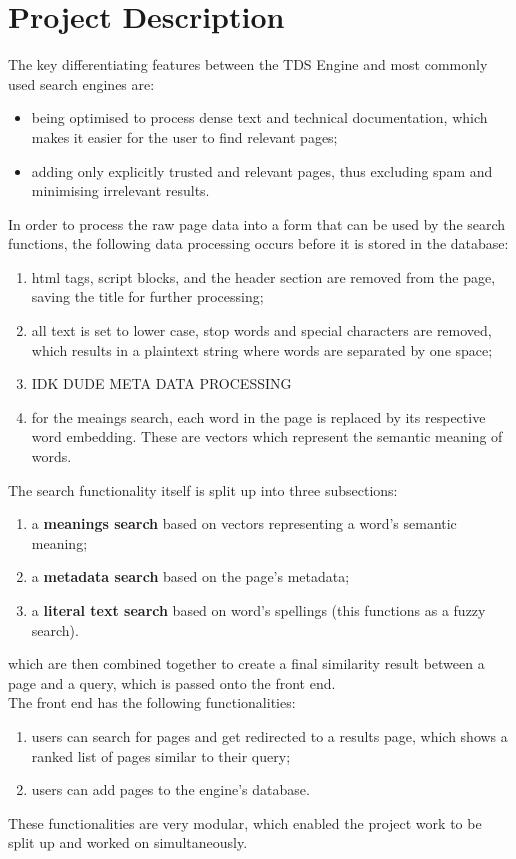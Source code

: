 \section{Project Description}

The key differentiating features between the TDS Engine and most commonly used search engines are:

\begin{itemize}
  \item being optimised to process dense text and technical documentation, which makes it easier for the user to find relevant pages;
  \item adding only explicitly trusted and relevant pages, thus excluding spam and minimising irrelevant results.
\end{itemize}

In order to process the raw page data into a form that can be used by the search functions, the following data processing occurs before it is stored in the database:
\begin{enumerate}
  \item html tags, script blocks, and the header section are removed from the page, saving the title for further processing;
  \item all text is set to lower case, stop words and special characters are removed, which results in a plaintext string where words are separated by one space;
  \item IDK DUDE META DATA PROCESSING
  \item for the meaings search, each word in the page is replaced by its respective word embedding. These are vectors which represent the semantic meaning of words. 
\end{enumerate}

The search functionality itself is split up into three subsections:
\begin{enumerate}
  \item a \textbf{meanings search} based on vectors representing a word's semantic meaning;
  \item a \textbf{metadata search} based on the page's metadata;
  \item a \textbf{literal text search} based on word's spellings (this functions as a fuzzy search).
\end{enumerate}
which are then combined together to create a final similarity result between a page and a query, which is passed onto the front end. \\

The front end has the following functionalities:
\begin{enumerate}
  \item users can search for pages and get redirected to a results page, which shows a ranked list of pages similar to their query;
  \item users can add pages to the engine's database.
\end{enumerate}

These functionalities are very modular, which enabled the project work to be split up and worked on simultaneously.  
